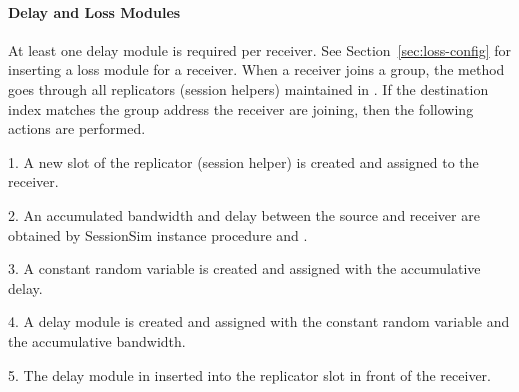 \paragraph{Delay and Loss Modules}

At least one delay module is required per receiver.
See Section~\ref{sec:loss-config} for inserting a loss module for a receiver.
When a receiver joins a group, 
the  method goes through
all replicators (session helpers) maintained in .
If the destination index matches the group address
the receiver are joining, then the following actions are performed.

1. A new slot of the replicator (session helper) is created and assigned to the receiver.

2. An accumulated bandwidth and delay between the source and receiver are obtained by SessionSim instance procedure  and .

3. A constant random variable is created and assigned with the
accumulative delay.

4. A delay module is created and assigned with the constant random 
variable and the accumulative bandwidth.

5. The delay module in inserted into the replicator slot in
front of the receiver.



